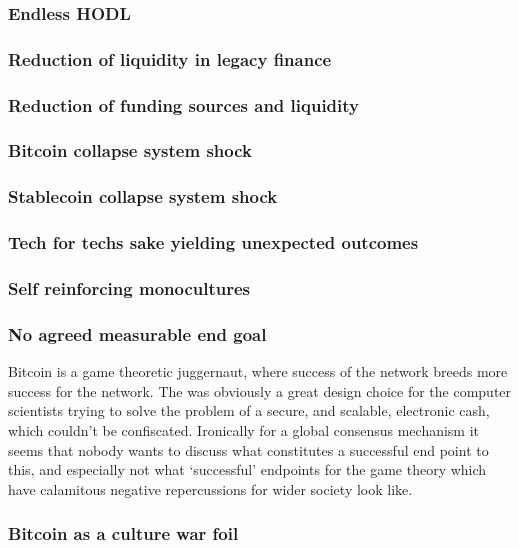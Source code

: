 \subsubsection{Endless HODL}
\subsubsection{Reduction of liquidity in legacy finance}
\subsubsection{Reduction of funding sources and liquidity}
\subsubsection{Bitcoin collapse system shock}
\subsubsection{Stablecoin collapse system shock}
\subsubsection{Tech for techs sake yielding unexpected outcomes}
\subsubsection{Self reinforcing monocultures}
\subsubsection{No agreed measurable end goal}
 Bitcoin is a game theoretic juggernaut, where success of the network breeds more success for the network. The was obviously a great design choice for the computer scientists trying to solve the problem of a secure, and scalable, electronic cash, which couldn't be confiscated. Ironically for a global consensus mechanism it seems that nobody wants to discuss what constitutes a successful end point to this, and especially not what `successful' endpoints for the game theory which have calamitous negative repercussions for wider society look like.
\subsubsection{Bitcoin as a culture war foil}
